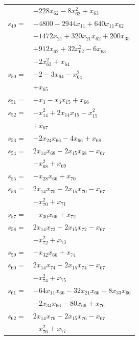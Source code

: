 \begin{longtable}{@{}r@{\;}l@{}}
 & \(\displaystyle -228x_{62} -8x_{62}^{2} +x_{63}\) \\[3pt]
\(s_{49}=\) & \(\displaystyle -4800 -2944x_{11} +640x_{11}x_{62}\) \\
 & \(\displaystyle -1472x_{21} +320x_{21}x_{62} +200x_{35}\) \\
 & \(\displaystyle +912x_{62} +32x_{62}^{2} -6x_{63}\) \\
 & \(\displaystyle -2x_{63}^{2} +x_{64}\) \\[3pt]
\(s_{50}=\) & \(\displaystyle -2 -3x_{64} -x_{64}^{2}\) \\
 & \(\displaystyle +x_{65}\) \\[3pt]
\(s_{51}=\) & \(\displaystyle -x_{3} -x_{3}x_{15} +x_{66}\) \\[3pt]
\(s_{52}=\) & \(\displaystyle -x_{14}^{2} +2x_{14}x_{15} -x_{15}^{2}\) \\
 & \(\displaystyle +x_{67}\) \\[3pt]
\(s_{53}=\) & \(\displaystyle -2x_{24}x_{66} -4x_{66} +x_{68}\) \\[3pt]
\(s_{54}=\) & \(\displaystyle 2x_{14}x_{68} -2x_{15}x_{68} -x_{67}\) \\
 & \(\displaystyle -x_{68}^{2} +x_{69}\) \\[3pt]
\(s_{55}=\) & \(\displaystyle -x_{28}x_{66} +x_{70}\) \\[3pt]
\(s_{56}=\) & \(\displaystyle 2x_{14}x_{70} -2x_{15}x_{70} -x_{67}\) \\
 & \(\displaystyle -x_{70}^{2} +x_{71}\) \\[3pt]
\(s_{57}=\) & \(\displaystyle -x_{30}x_{66} +x_{72}\) \\[3pt]
\(s_{58}=\) & \(\displaystyle 2x_{14}x_{72} -2x_{15}x_{72} -x_{67}\) \\
 & \(\displaystyle -x_{72}^{2} +x_{73}\) \\[3pt]
\(s_{59}=\) & \(\displaystyle -x_{32}x_{66} +x_{74}\) \\[3pt]
\(s_{60}=\) & \(\displaystyle 2x_{14}x_{74} -2x_{15}x_{74} -x_{67}\) \\
 & \(\displaystyle -x_{74}^{2} +x_{75}\) \\[3pt]
\(s_{61}=\) & \(\displaystyle -64x_{11}x_{66} -32x_{21}x_{66} -8x_{33}x_{66}\) \\
 & \(\displaystyle -2x_{34}x_{66} -80x_{66} +x_{76}\) \\[3pt]
\(s_{62}=\) & \(\displaystyle 2x_{14}x_{76} -2x_{15}x_{76} -x_{67}\) \\
 & \(\displaystyle -x_{76}^{2} +x_{77}\) \\[3pt]

\end{longtable}
